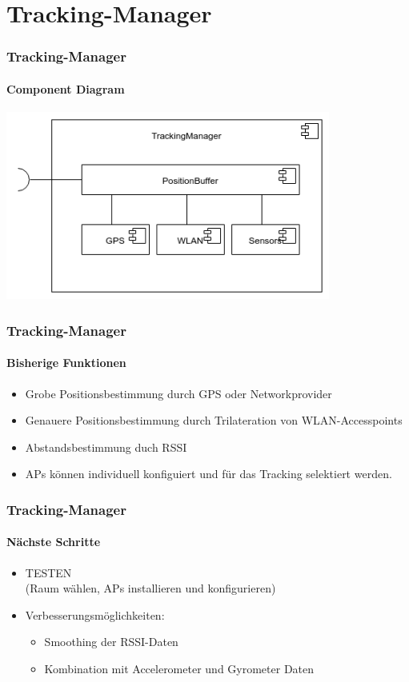 \documentclass{beamer}
\begin{document}
\section{Tracking-Manager}

\begin{frame}
\frametitle{Tracking-Manager}
\framesubtitle{Component Diagram}
\hspace{1cm} \includegraphics[width=0.8\textwidth]{../doc/SDD/pics/TrackingManager_Composition.png}
\end{frame}

\begin{frame}
\frametitle{Tracking-Manager}
\framesubtitle{Bisherige Funktionen}
\begin{itemize}
  \item Grobe Positionsbestimmung durch GPS oder Networkprovider
  \item	Genauere Positionsbestimmung durch Trilateration von WLAN-Accesspoints
  \item	Abstandsbestimmung duch RSSI
  \item	APs k\"onnen individuell konfiguiert und f\"ur das Tracking selektiert werden. 
\end{itemize}
\end{frame}

\begin{frame}
\frametitle{Tracking-Manager}
\framesubtitle{N\"achste Schritte}
\begin{itemize}
  \item TESTEN\\
  		(Raum w\"ahlen, APs installieren und konfigurieren)
  \item Verbesserungsmöglichkeiten:
  		\begin{itemize}
  		\item	Smoothing der RSSI-Daten
  		\item	Kombination mit Accelerometer und Gyrometer Daten
  		\end{itemize}
\end{itemize}
\end{frame}
\end{document}
